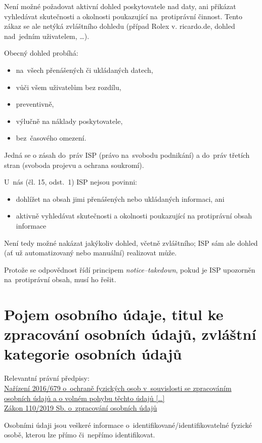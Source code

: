 Není možné požadovat aktivní dohled poskytovatele nad daty, ani přikázat vyhledávat skutečnosti a okolnosti poukazující na~protiprávní činnost.
Tento zákaz se ale netýká zvláštního dohledu (případ Rolex v. ricardo.de, dohled nad~jedním uživatelem, \dots).

Obecný dohled probíhá:
\begin{itemize}
    \item na~všech přenášených či ukládaných datech,
    \item vůči všem uživatelům bez rozdílu,
    \item preventivně,
    \item výlučně na náklady poskytovatele,
    \item bez~časového omezení.
\end{itemize}
Jedná se o zásah do~práv ISP (právo na~svobodu podnikání) a do~práv třetích stran (svoboda projevu a ochrana soukromí).

U~nás (čl. 15, odst.~1) ISP nejsou povinni:
\begin{itemize}
    \item dohlížet na obsah jimi přenášených nebo ukládaných informaci, ani
    \item aktivně vyhledávat skutečnosti a okolnosti poukazující na protiprávní obsah informace
\end{itemize}

Není tedy možné nakázat jakýkoliv dohled, včetně zvláštního; ISP sám ale dohled (ať už automatizovaný nebo manuální) realizovat může.

Protože se odpovědnost řídí principem \emph{notice--takedown}, pokud je ISP upozorněn na~protiprávní obsah, musí ho řešit.


\clearpage
\section{Pojem osobního údaje, titul ke zpracování osobních údajů, zvláštní kategorie osobních údajů}

{}Relevantní právní předpisy:
\\\href{https://eur-lex.europa.eu/legal-content/CS/ALL/?uri=CELEX:32016R0679
}{Nařízení 2016/679 o~ochraně fyzických osob v~souvislosti se zpracováním osobních údajů a o volném pohybu těchto údajů [\dots]}
\\\href{https://www.zakonyprolidi.cz/cs/2019-110}{Zákon 110/2019 Sb. o~zpracování osobních údajů}

Osobními údaji jsou veškeré informace o~identifikované/identifikovatelné fyzické osobě, kterou lze přímo či~nepřímo identifikovat.

